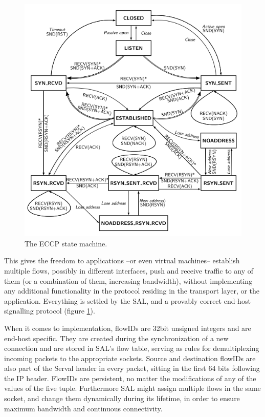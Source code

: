 \begin{figure}
\centering
{}
\includegraphics[scale=0.6]{figures/ECCP_sm}
\caption[The ECCP state machine]{The ECCP \cite{Arye2012} state machine.}
\label{fig:EECP_sm}
\end{figure}

This gives the freedom to applications --or even virtual machines-- establish multiple flows, possibly in different interfaces, push and receive traffic to any of them (or a combination of them, increasing bandwidth), without implementing any additional functionality in the protocol residing in the transport layer, or the application.
Everything is settled by the SAL, and a provably correct end-host signalling protocol (figure \ref{fig:EECP_sm}).

When it comes to implementation, flowIDs are 32bit unsigned integers and are end-host specific.
They are created during the synchronization of a new connection and are stored in SAL's flow table, serving as rules for demultiplexing incoming packets to the appropriate sockets.
Source and destination flowIDs are also part of the Serval header in every packet, sitting in the first 64 bits following the IP header.
FlowIDs are persistent, no matter the modifications of any of the values of the five tuple.
Furthermore SAL might assign multiple flows in the same socket, and change them dynamically during its lifetime, in order to ensure maximum bandwidth and continuous connectivity.